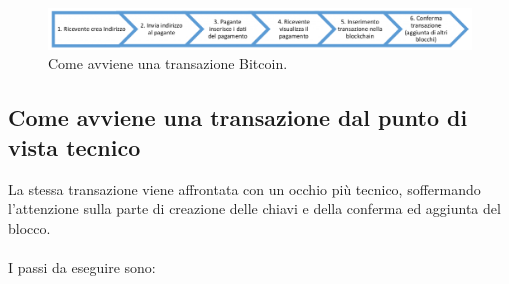 \begin{figure}[H]
	\centering
	\includegraphics[width=\textwidth]{images/transazioneBitcoin.png}
	\caption{Come avviene una transazione Bitcoin.}
	\label{fig:bitcoinTransaction}
\end{figure}

\subsection{Come avviene una transazione dal punto di vista tecnico}
\label{sec:come avviene una transazione dal punto di vista tecnico}
La stessa transazione viene affrontata con un occhio più tecnico, soffermando l'attenzione sulla parte di creazione delle chiavi e della conferma ed aggiunta del blocco.
\\
\\I passi da eseguire sono:

